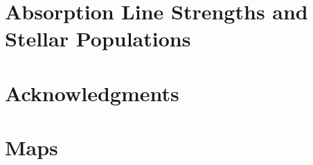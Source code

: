 \documentclass[fleqn,usenatbib,useAMS]{mnras}
\begin{document}
	

\section{Absorption Line Strengths and Stellar Populations}
	\label{sec:stellarPop}
	






\section*{Acknowledgments}







{}

\appendix
\section{Maps}
	\label{sec:Maps}
\end{document}
